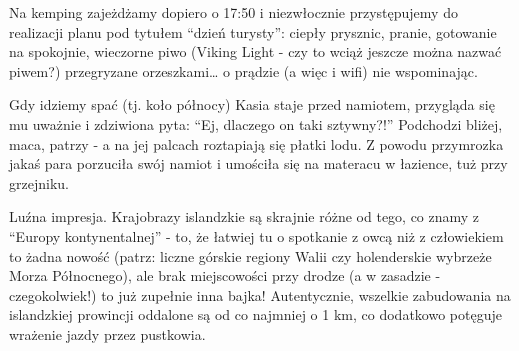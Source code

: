 
Na kemping zajeżdżamy dopiero o 17:50 i niezwłocznie przystępujemy do realizacji planu pod tytułem “dzień turysty”: ciepły prysznic, pranie, gotowanie na spokojnie, wieczorne piwo (Viking Light - czy to wciąż jeszcze można nazwać piwem?) przegryzane orzeszkami… o prądzie (a więc i wifi) nie wspominając.

Gdy idziemy spać (tj. koło północy) Kasia staje przed namiotem, przygląda się mu uważnie i zdziwiona pyta: “Ej, dlaczego on taki sztywny?!” Podchodzi bliżej, maca, patrzy - a na jej palcach roztapiają się płatki lodu. Z powodu przymrozka jakaś para porzuciła swój namiot i umościła się na materacu  w łazience, tuż przy grzejniku.


Luźna impresja. Krajobrazy islandzkie są skrajnie różne od tego, co znamy z “Europy kontynentalnej” - to, że łatwiej tu o spotkanie z owcą niż z człowiekiem to żadna nowość (patrz: liczne górskie regiony Walii czy holenderskie wybrzeże Morza Północnego), ale brak miejscowości przy drodze (a w zasadzie - czegokolwiek!) to już zupełnie inna bajka! Autentycznie, wszelkie zabudowania na islandzkiej prowincji oddalone są od  co najmniej o 1 km, co dodatkowo potęguje wrażenie jazdy przez pustkowia.



